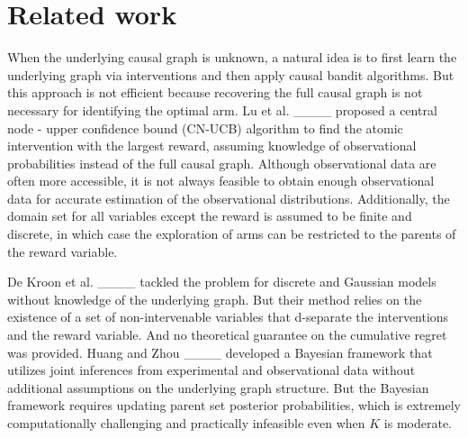 \section{Related work}
When the underlying causal graph is unknown, a natural idea is to first learn the underlying graph via interventions and then apply causal bandit algorithms. But this approach is not efficient because recovering the full causal graph is not necessary for identifying the optimal arm. Lu et al. ____ proposed a central node - upper confidence bound (CN-UCB) algorithm to find the atomic intervention with the largest reward, assuming knowledge of observational probabilities instead of the full causal graph. Although observational data are often more accessible, %
it is not always feasible to obtain enough observational data for accurate estimation of the observational distributions. Additionally, the domain set for all variables except the reward is assumed to be finite and discrete, in which case the exploration of arms can be restricted to the parents of the reward variable.

De Kroon et al. ____ tackled the problem for discrete and Gaussian models without knowledge of the underlying graph. But their method relies on the existence of a set of non-intervenable variables that d-separate the interventions and the reward variable. And no theoretical guarantee on the cumulative regret was provided. Huang and Zhou ____ developed a Bayesian framework that utilizes joint inferences from experimental %
and observational data without additional assumptions on the underlying graph structure. But the Bayesian framework requires updating parent set posterior probabilities, which is extremely computationally challenging and practically infeasible even when $K$ is moderate.